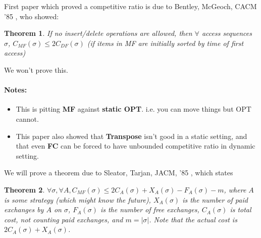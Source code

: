 \documentclass[11pt]{article}
\newtheorem{theorem}{Theorem}
\begin{document}
First paper which proved a competitive ratio is due to Bentley, McGeoch, CACM '85 \cite{bent85}, who showed:
\begin{theorem}
	If no insert/delete operations are allowed, then $\forall$ access sequences $\sigma$, $C_{MF}(\sigma) \leq 2C_{DF}(\sigma)$ (if items in MF are initially sorted by time of first access)
\end{theorem}

We won't prove this.

\paragraph{Notes:}
\begin{itemize}
	\item This is pitting {\bf MF} against {\bf static OPT}. i.e. you can move things but OPT cannot.
	\item This paper also showed that {\bf Transpose} isn't good in a static setting, and that even {\bf FC} can be forced to have unbounded competitive ratio in dynamic setting.
\end{itemize}

We will prove a theorem due to Sleator, Tarjan, JACM, '85 \cite{sleat85}, which states
\begin{theorem}
	$\forall \sigma, \forall A, C_{MF}(\sigma) \leq 2C_A(\sigma) + X_A(\sigma) - F_A(\sigma) - m$, where $A$ is some strategy (which might know the future), $X_A(\sigma)$ is the number of paid exchanges by $A$ on $\sigma$, $F_A(\sigma)$ is the number of free exchanges, $C_A(\sigma)$ is total cost, not counting paid exchanges, and $m = |\sigma|$. Note that the actual cost is $2C_A(\sigma) + X_A(\sigma)$.
\end{theorem}
\end{document}
